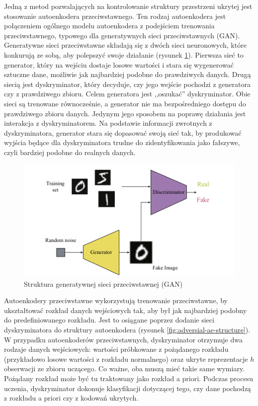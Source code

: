\documentclass[12pt]{mwbk}
\theoremstyle{plain}
\theoremstyle{definition}
\theoremstyle{remark}
\newcommand\zrodlo[1]{\par\vspace{-3mm}{\small\textit{Źródło: }#1 }}
\begin{document}
Jedną z metod pozwalających na kontrolowanie struktury przestrzeni ukrytej jest stosowanie autoenkodera przeciwstawnego. Ten rodzaj autoenkodera jest połączeniem ogólnego modelu autoenkodera z podejściem trenowania przeciwstawnego, typowego dla generatywnych sieci przeciwstawnych (GAN). Generatywne sieci przeciwstawne składają się z dwóch sieci neuronowych, które konkurują ze sobą, aby polepszyć swoje działanie (rysunek \ref{fig:gan-structure}). Pierwsza sieć to generator, który na wejściu dostaje losowe wartości i stara się wygenerować sztuczne dane, możliwie jak najbardziej podobne do prawdziwych danych. Drugą siecią jest dyskryminator, który decyduje, czy jego wejście pochodzi z generatora czy z prawdziwego zbioru. Celem generatora jest ,,oszukać'' dyskryminator. Obie sieci są trenowane równocześnie, a generator nie ma bezpośredniego dostępu do prawdziwego zbioru danych. Jedynym jego sposobem na poprawę działania jest interakcja z dyskryminatorem. Na podstawie informacji zwrotnych z dyskryminatora, generator stara się dopasować swoją sieć tak, by produkować wyjścia będące dla dyskryminatora trudne do zidentyfikowania jako fałszywe, czyli bardziej podobne do realnych danych.


\begin{figure}[!h]
	\centering
	\includegraphics[width=\linewidth]{rys/gan_structure.png}
	\caption{Struktura generatywnej sieci przeciwstawnej (GAN)}
	\zrodlo{\cite{pinaya}}
	\label{fig:gan-structure}
\end{figure}

Autoenkodery przeciwstawne wykorzystują trenowanie przeciwstawne, by ukształtować rozkład danych wejściowych tak, aby był jak najbardziej podobny do predefiniowanego rozkładu. Jest to osiągane poprzez dodanie sieci dyskryminatora do struktury autoenkodera (rysunek \ref{fig:adversial-ae-structure}). W przypadku autoenkoderów przeciwstawnych, dyskryminator otrzymuje dwa rodzaje danych wejściowych: wartości próbkowane z pożądanego rozkładu (przykładowo losowe wartości z rozkładu normalnego) oraz ukryte reprezentacje $h$ obserwacji ze zbioru uczącego. Co ważne, oba muszą mieć takie same wymiary. Pożądany rozkład może być tu traktowany jako rozkład a priori. Podczas procesu uczenia, dyskryminator dokonuje klasyfikacji dotyczącej tego, czy dane pochodzą z rozkładu a priori czy z kodowań ukrytych.
\end{document}
